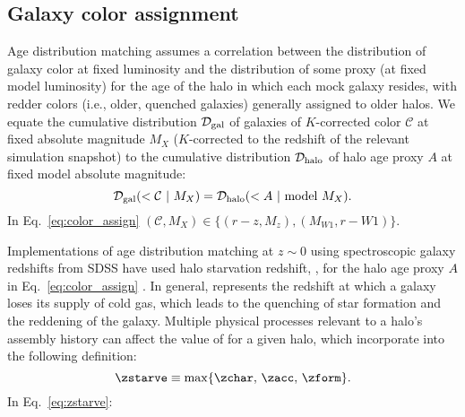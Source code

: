 \documentclass[twocolumn,apj,iop,tighten]{emulateapj2}
\begin{document}
\subsection{Galaxy color assignment}\label{subsec:color_assign}

Age distribution matching assumes a correlation between the distribution of galaxy color at fixed luminosity and the distribution of some proxy (at fixed model luminosity) for the age of the halo in which each mock galaxy resides, with redder colors (i.e., older, quenched galaxies) generally assigned to older halos. We equate the cumulative distribution $\mathcal{D}_{\rm gal}$ of galaxies of $K$-corrected color $\mathcal{C}$ at fixed absolute magnitude $M_X$ ($K$-corrected to the redshift of the relevant simulation snapshot) to the cumulative distribution $\mathcal{D}_{\rm halo}$ of halo age proxy $A$ at fixed model absolute magnitude:
%
\begin{equation}\label{eq:color_assign}
\mathcal{D}_{\rm gal} ( < \mathcal{C}\ |\ M_X )=\mathcal{D}_{\rm halo}( < A\ |\ {\rm model}\ M_X ).
\end{equation}
%
\noindent In Eq.~\ref{eq:color_assign} ${(\mathcal{C},M_X) \in \{(r-z, M_z), (M_{W1}, r-W1)\}}$.

Implementations of age distribution matching at $z\sim0$ using spectroscopic galaxy redshifts from SDSS have used halo starvation redshift, \zstarve, for the halo age proxy $A$ in Eq.~\ref{eq:color_assign} \citep{hearin_watson13, hearin_etal14, safonova_etal21}. In general, \zstarve represents the redshift at which a galaxy loses its supply of cold gas, which leads to the quenching of star formation and the reddening of the galaxy. Multiple physical processes relevant to a halo's assembly history can affect the value of \zstarve for a given halo, which \citet{hearin_watson13} incorporate into the following definition:
%
\begin{equation}\label{eq:zstarve}
\zstarve \equiv \max\{\zchar,\, \zacc,\, \zform\}.
\end{equation}
%
\noindent In Eq.~\ref{eq:zstarve}:
\end{document}
